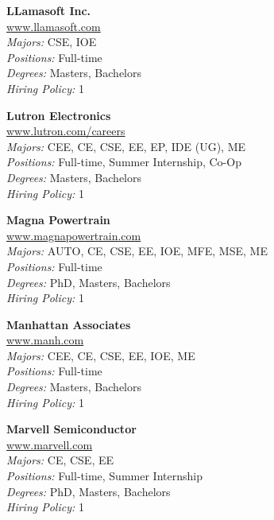 \documentclass{article}
\begin{document}
\begin{center}
\begin{multicols}{3}
\begin{minipage}{.9\columnwidth}{\Large\bf LLamasoft Inc. }\\
	\url{www.llamasoft.com}\\
	\emph{Majors:} CSE, IOE\\
	\emph{Positions:} Full-time\\
	\emph{Degrees:} Masters, Bachelors\\
	\emph{Hiring Policy:} 1\\
\end{minipage}
 
\begin{minipage}{.9\columnwidth}{\Large\bf Lutron Electronics }\\
	\url{www.lutron.com/careers}\\
	\emph{Majors:} CEE, CE, CSE, EE, EP, IDE (UG), ME\\
	\emph{Positions:} Full-time, Summer Internship, Co-Op\\
	\emph{Degrees:} Masters, Bachelors\\
	\emph{Hiring Policy:} 1\\
\end{minipage}
 
\begin{minipage}{.9\columnwidth}{\Large\bf Magna Powertrain }\\
	\url{www.magnapowertrain.com}\\
	\emph{Majors:} AUTO, CE, CSE, EE, IOE, MFE, MSE, ME\\
	\emph{Positions:} Full-time\\
	\emph{Degrees:} PhD, Masters, Bachelors\\
	\emph{Hiring Policy:} 1\\
\end{minipage}
 
\begin{minipage}{.9\columnwidth}{\Large\bf Manhattan Associates }\\
	\url{www.manh.com}\\
	\emph{Majors:} CEE, CE, CSE, EE, IOE, ME\\
	\emph{Positions:} Full-time\\
	\emph{Degrees:} Masters, Bachelors\\
	\emph{Hiring Policy:} 1\\
\end{minipage}
 
\begin{minipage}{.9\columnwidth}{\Large\bf Marvell Semiconductor }\\
	\url{www.marvell.com}\\
	\emph{Majors:} CE, CSE, EE\\
	\emph{Positions:} Full-time, Summer Internship\\
	\emph{Degrees:} PhD, Masters, Bachelors\\
	\emph{Hiring Policy:} 1\\
\end{minipage}
 

\end{multicols}
\end{center}
\end{document}
